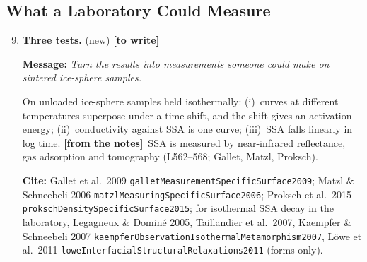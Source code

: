 \documentclass[11pt]{article}
\newcommand{\Miss}{\textcolor{miss}{\textbf{[to write]}}\ }
\newcommand{\Note}{\textcolor{open}{\textbf{[from the notes]}}\ }
\newcommand{\Cite}[1]{\par{\footnotesize\raggedright\textcolor{have}{\textbf{Cite:}} #1\par}}
\newcommand{\Msg}[1]{\par\textcolor{open}{\textbf{Message:}} \textit{#1}\par}
\newcommand{\New}[1]{\textbf{#1} \textnormal{\small(new)}}
\begin{document}
\subsection{What a Laboratory Could Measure}
\begin{enumerate}
\setcounter{enumi}{8}
\item \New{Three tests.} \Miss
  \Msg{Turn the results into measurements someone could make on sintered ice-sphere samples.}
  On unloaded ice-sphere samples held
  isothermally: (i)~curves at different temperatures superpose under a time
  shift, and the shift gives an activation energy; (ii)~conductivity against
  SSA is one curve; (iii)~SSA falls linearly in log time. \Note SSA is
  measured by near-infrared reflectance, gas adsorption and tomography
  (L562--568; Gallet, Matzl, Proksch).
  \Cite{Gallet et al.\ 2009 \texttt{galletMeasurementSpecificSurface2009}; Matzl \& Schneebeli 2006 \texttt{matzlMeasuringSpecificSurface2006}; Proksch et al.\ 2015 \texttt{prokschDensitySpecificSurface2015}; for isothermal SSA decay in the laboratory, Legagneux \& Domin\'e 2005, Taillandier et al.\ 2007, Kaempfer \& Schneebeli 2007 \texttt{kaempferObservationIsothermalMetamorphism2007}, L\"owe et al.\ 2011 \texttt{loweInterfacialStructuralRelaxations2011} (forms only).}
\end{enumerate}
\end{document}
